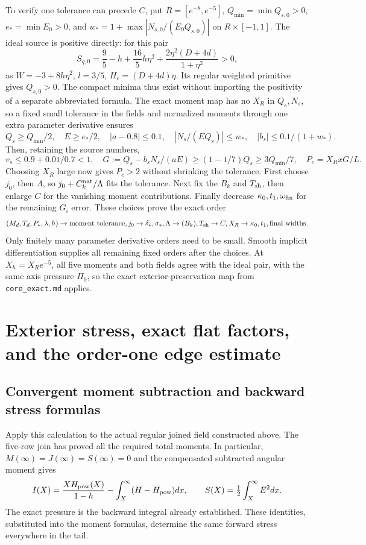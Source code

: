 \documentclass[10pt,a4paper]{article}
\begin{document}
To verify one tolerance can precede \(C\), put \(R=[e^{-8},e^{-5}]\), \(Q_{\min}=\min Q_{s,0}>0\), \(e_* =\min E_0>0\), and \(w_*=1+\max|N_{s,0}/(E_0Q_{s,0})|\) on \(R\times[-1,1]\). The ideal source is positive directly: for this pair
\[
S_{q,0}=\frac95-h+\frac{16}{5}h\eta^2
+\frac{2\eta^2(D+4d)}{1+\eta^2}>0,
\]
as \(W=-3+8h\eta^2\), \(l=3/5\), \(H_c=(D+4d)\eta\). Its regular weighted primitive gives \(Q_{s,0}>0\). The compact minima thus exist without importing the positivity of a separate abbreviated formula. The exact moment map has no \(X_R\) in \(Q_s,N_s\), so a fixed small tolerance in the fields and normalized moments through one extra parameter derivative ensures
\[
Q_s\ge Q_{\min}/2,\quad E\ge e_*/2,\quad |a-0.8|\le0.1,
\quad|N_s/(EQ_s)|\le w_*,\quad |b_s|\le0.1/(1+w_*).
\]
Then, retaining the source numbers,
\[
v_s\le0.9+0.01/0.7<1,
\quad G:=Q_s-b_sN_s/(aE)\ge(1-1/7)Q_s\ge3Q_{\min}/7,
\quad P_c=X_RxG/L.
\]
Choosing \(X_R\) large now gives \(P_c>2\) without shrinking the tolerance. First choose \(j_0\), then \(\Lambda\), so \(j_0+C_k^{\rm nat}/\Lambda\) fits the tolerance. Next fix the \(B_k\) and \(T_{\rm sh}\), then enlarge \(C\) for the vanishing moment contributions. Finally decrease \(\kappa_0,t_1,\omega_{\rm fin}\) for the remaining \(G_i\) error. These choices prove the exact order
\[
(M_d,T_d,P_*,\lambda,h)\to\text{moment tolerance},j_0
\to\delta_*,\sigma_*,\Lambda\to(B_k),T_{\rm sh}
\to C,X_R\to\kappa_0,t_1,\text{final widths}.
\]
Only finitely many parameter derivative orders need to be small. Smooth implicit differentiation supplies all remaining fixed orders after the choices. At \(X_h=X_Re^{-5}\), all five moments and both fields agree with the ideal pair, with the same axis pressure \(\Pi_0\), so the exact exterior-preservation map from \texttt{core\_exact.md} applies.


\section{Exterior stress, exact flat factors, and the order-one edge estimate}\label{pa:sec:component-edge}
\subsection{Convergent moment subtraction and backward stress formulas}
Apply this calculation to the actual regular joined field constructed above.
The five-row join has proved all the required total moments. In particular, $M(\infty)=J(\infty)=S(\infty)=0$ and the compensated
subtracted angular moment gives
\[
I(X)=\frac{XH_{\rm pow}(X)}{1-h}-\int_X^\infty(H-H_{\rm pow})dx,
\qquad S(X)=\tfrac12\int_X^\infty E^2dx.
\]
The exact pressure is the backward integral already established. These
identities, substituted into the moment formulas, determine the same forward
stress everywhere in the tail.
\end{document}
